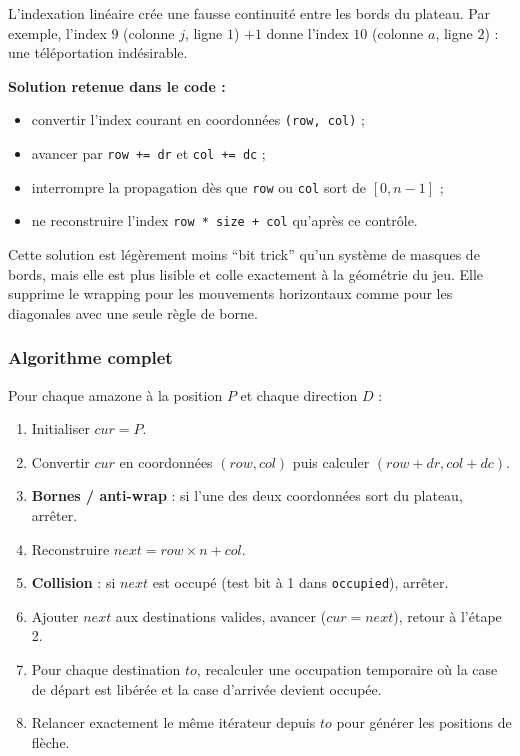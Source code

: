 \documentclass[a4paper]{article}
\begin{document}
L'indexation linéaire crée une fausse continuité entre les bords du plateau. Par exemple, l'index $9$ (colonne $j$, ligne $1$) $+ 1$ donne l'index $10$ (colonne $a$, ligne $2$) : une téléportation indésirable.

\textbf{Solution retenue dans le code :}
\begin{itemize}
    \item convertir l'index courant en coordonnées \texttt{(row, col)} ;
    \item avancer par \texttt{row += dr} et \texttt{col += dc} ;
    \item interrompre la propagation dès que \texttt{row} ou \texttt{col} sort de $[0, n{-}1]$ ;
    \item ne reconstruire l'index \texttt{row * size + col} qu'après ce contrôle.
\end{itemize}

Cette solution est légèrement moins ``bit trick'' qu'un système de masques de bords, mais elle est plus lisible et colle exactement à la géométrie du jeu. Elle supprime le wrapping pour les mouvements horizontaux comme pour les diagonales avec une seule règle de borne.

\subsubsection{Algorithme complet}

Pour chaque amazone à la position $P$ et chaque direction $D$ :
\begin{enumerate}
    \item Initialiser $cur = P$.
    \item Convertir $cur$ en coordonnées $(row, col)$ puis calculer $(row + dr, col + dc)$.
    \item \textbf{Bornes / anti-wrap} : si l'une des deux coordonnées sort du plateau, arrêter.
    \item Reconstruire $next = row \times n + col$.
    \item \textbf{Collision} : si $next$ est occupé (test bit à 1 dans \texttt{occupied}), arrêter.
    \item Ajouter $next$ aux destinations valides, avancer ($cur = next$), retour à l'étape 2.
    \item Pour chaque destination $to$, recalculer une occupation temporaire où la case de départ est libérée et la case d'arrivée devient occupée.
    \item Relancer exactement le même itérateur depuis $to$ pour générer les positions de flèche.
\end{enumerate}
\end{document}
